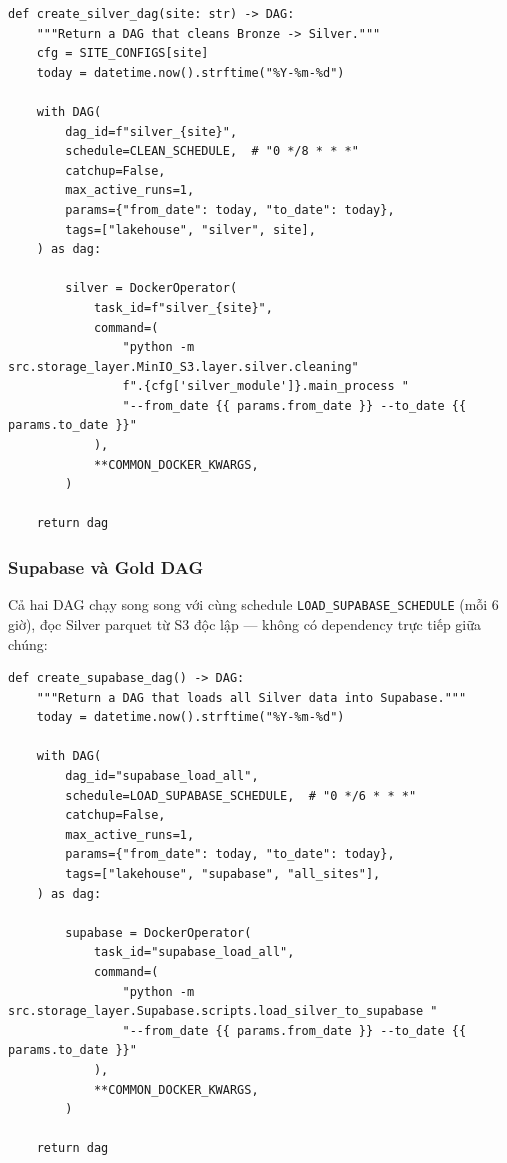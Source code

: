 \begin{lstlisting}[style=pystyle, caption={create\_silver\_dag — cleaning Bronze thành Silver}]
def create_silver_dag(site: str) -> DAG:
    """Return a DAG that cleans Bronze -> Silver."""
    cfg = SITE_CONFIGS[site]
    today = datetime.now().strftime("%Y-%m-%d")

    with DAG(
        dag_id=f"silver_{site}",
        schedule=CLEAN_SCHEDULE,  # "0 */8 * * *"
        catchup=False,
        max_active_runs=1,
        params={"from_date": today, "to_date": today},
        tags=["lakehouse", "silver", site],
    ) as dag:

        silver = DockerOperator(
            task_id=f"silver_{site}",
            command=(
                "python -m src.storage_layer.MinIO_S3.layer.silver.cleaning"
                f".{cfg['silver_module']}.main_process "
                "--from_date {{ params.from_date }} --to_date {{ params.to_date }}"
            ),
            **COMMON_DOCKER_KWARGS,
        )

    return dag
\end{lstlisting}

\subsubsection{Supabase và Gold DAG}

Cả hai DAG chạy song song với cùng schedule \texttt{LOAD\_SUPABASE\_SCHEDULE}
(mỗi 6 giờ), đọc Silver parquet từ S3 độc lập --- không có dependency trực tiếp
giữa chúng:

\begin{lstlisting}[style=pystyle, caption={create\_supabase\_dag — UPSERT Silver vào Supabase Postgres}]
def create_supabase_dag() -> DAG:
    """Return a DAG that loads all Silver data into Supabase."""
    today = datetime.now().strftime("%Y-%m-%d")

    with DAG(
        dag_id="supabase_load_all",
        schedule=LOAD_SUPABASE_SCHEDULE,  # "0 */6 * * *"
        catchup=False,
        max_active_runs=1,
        params={"from_date": today, "to_date": today},
        tags=["lakehouse", "supabase", "all_sites"],
    ) as dag:

        supabase = DockerOperator(
            task_id="supabase_load_all",
            command=(
                "python -m src.storage_layer.Supabase.scripts.load_silver_to_supabase "
                "--from_date {{ params.from_date }} --to_date {{ params.to_date }}"
            ),
            **COMMON_DOCKER_KWARGS,
        )

    return dag
\end{lstlisting}

